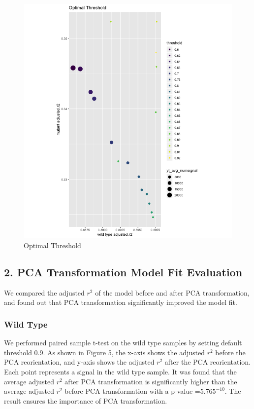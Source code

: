 \documentclass[10pt,letterpaper]{article}
\begin{document}
\begin{figure}[H]
\includegraphics[width=1\linewidth]{visualization_paper/optimal_threshold} \caption{Optimal Threshold}\label{fig:Figure4}
\end{figure}

\hypertarget{pca-transformation-model-fit-evaluation}{%
\subsection{2. PCA Transformation Model Fit
Evaluation}\label{pca-transformation-model-fit-evaluation}}

We compared the adjusted \(r^2\) of the model before and after PCA
transformation, and found out that PCA transformation significantly
improved the model fit.

\hypertarget{wild-type-1}{%
\subsubsection{Wild Type}\label{wild-type-1}}

We performed paired sample t-test on the wild type samples by setting
default threshold 0.9. As shown in Figure 5, the x-axis shows the
adjusted \(r^2\) before the PCA reorientation, and y-axis shows the
adjusted \(r^2\) after the PCA reorientation. Each point represents a
signal in the wild type sample. It was found that the average adjusted
\(r^2\) after PCA transformation is significantly higher than the
average adjusted \(r^2\) before PCA transformation with a p-value
=\(5.765^{-10}\). The result ensures the importance of PCA
transformation.\\
\end{document}
